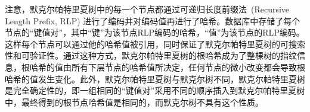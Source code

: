 注意，默克尔帕特里夏树中的每一个节点都通过可递归长度前缀法~\cite{RLP_code}(Recursive Length Prefix, RLP) 进行了编码并对编码值再进行了哈希。数据库中存储了每个节点的“键值对”，其中“键”为该节点RLP编码的哈希，“值”为该节点的RLP编码。这样每个节点可以通过他的哈希值被引用，同时保证了默克尔帕特里夏树的可搜索性和可验证性。通过这种方式，默克尔帕特里夏树的根哈希成为了整棵树的指纹信息，根哈希的值由所有下层节点的哈希值所决定，任何节点的微小改变都会导致根哈希的值发生变化。此外，默克尔帕特里夏树与默克尔树不同，默克尔帕特里夏树是完全确定性的，即一组相同的“键值对”采用不同的顺序插入到默克尔帕特里夏树中，最终得到的根节点哈希值是相同的，而默克尔树不具有这个性质。





